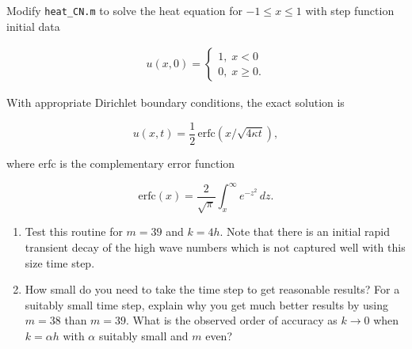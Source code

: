 Modify \texttt{heat\_CN.m} to solve the heat equation for $-1 \leq x \leq 1$ with step function initial data

\begin{align*}
    u(x,0) = \begin{cases}
          1, \; x < 0 \\
          0, \; x \geq 0.
    \end{cases}
\end{align*} 

With appropriate Dirichlet boundary conditions, the exact solution is

$$
    u(x,t) = \frac{1}{2} \, \text{erfc} \left(x / \sqrt{4 \kappa t}\right),
$$

where erfc is the complementary error function

$$
\text{erfc}(x) = \frac{2}{\sqrt{\pi}} \int_x^\infty e^{-z^2}\,dz.
$$

\begin{enumerate}
    \item
    Test this routine for $m = 39$ and $k = 4h$. Note that there is an initial rapid transient decay of the high wave 
    numbers which is not captured well with this size time step.
    
    \item
    How small do you need to take the time step to get reasonable results? For a suitably small time step, explain why
    you get much better results by using $m = 38$ than $m = 39$.  What is the observed order of accuracy as $k \to 0$ 
    when $k = \alpha h$ with $\alpha$ suitably small and $m$ even?
\end{enumerate}


\begin{solution}\ \\\\
    \hfill\vfill
    \ \\
\end{solution}